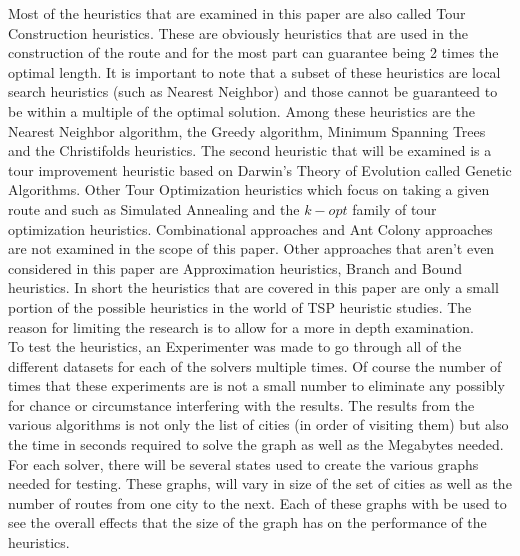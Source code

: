 \documentclass[midd]{thesis}
\newcommand{\tab}{\hspace*{2em}}
\begin{document}
\tab Most of the heuristics that are examined in this paper are also called Tour Construction heuristics. These are obviously heuristics that are used in the construction of the route and for the most part can guarantee being 2 times the optimal length. It is important to note that a subset of these heuristics are local search heuristics (such as Nearest Neighbor) and those cannot be guaranteed to be within a multiple of the optimal solution\cite{ttps}. Among these heuristics are the Nearest Neighbor algorithm, the Greedy algorithm, Minimum Spanning Trees and the Christifolds heuristics. The second heuristic that will be examined is a tour improvement heuristic based on Darwin's Theory of Evolution called Genetic Algorithms. Other Tour Optimization heuristics which focus on taking a given route and such as Simulated Annealing and the $k-opt$ family of tour optimization heuristics. Combinational approaches and Ant Colony approaches are not examined in the scope of this paper. Other approaches that aren't even considered in this paper are Approximation heuristics, Branch and Bound heuristics. In short the heuristics that are covered in this paper are only a small portion of the possible heuristics in the world of TSP heuristic studies. The reason for limiting the research is to allow for a more in depth examination.\\
\tab To test the heuristics, an Experimenter was made to go through all of the different datasets for each of the solvers multiple times. Of course the number of times that these experiments are is not a small number to eliminate any possibly for chance or circumstance interfering with the results. The results from the various algorithms is not only the list of cities (in order of visiting them) but also the time in seconds required to solve the graph as well as the Megabytes needed. For each solver, there will be several states used to create the various graphs needed for testing. These graphs, will vary in size of the set of cities as well as the number of routes from one city to the next. Each of these graphs with be used to see the overall effects that the size of the graph has on the performance of the heuristics.\\
\end{document}
